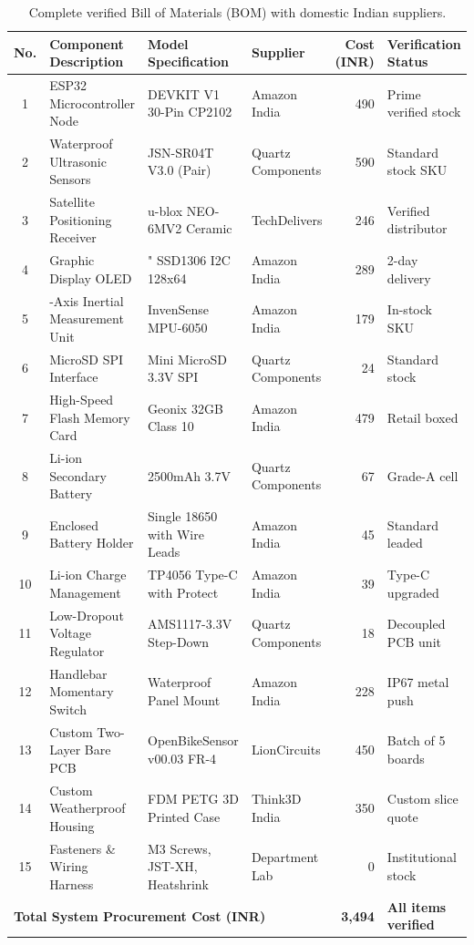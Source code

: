 \begin{table}[h!]
	\centering
	\caption{Complete verified Bill of Materials (BOM) with domestic Indian suppliers.}
	\label{tab:bom_verified}
	\setlength{\tabcolsep}{4pt}
	\renewcommand{\arraystretch}{1.2}
	\begin{tabularx}{\textwidth}{|c|>{\raggedright\arraybackslash}p{3.5cm}|>{\raggedright\arraybackslash}p{3.0cm}|>{\raggedright\arraybackslash}p{2.3cm}|r|X|}
		\hline
		\textbf{No.} & \textbf{Component Description} & \textbf{Model Specification} & \textbf{Supplier} & \textbf{Cost (INR)} & \textbf{Verification Status} \\
		\hline
		\hline
		1 & ESP32 Microcontroller Node & DEVKIT V1 30-Pin CP2102 & Amazon India & 490 & Prime verified stock \\
		2 & Waterproof Ultrasonic Sensors & JSN-SR04T V3.0 (Pair) & Quartz Components & 590 & Standard stock SKU \\
		3 & Satellite Positioning Receiver & u-blox NEO-6MV2 Ceramic & TechDelivers & 246 & Verified distributor \\
		4 & Graphic Display OLED & 0.96" SSD1306 I2C 128x64 & Amazon India & 289 & 2-day delivery \\
		5 & 6-Axis Inertial Measurement Unit & InvenSense MPU-6050 & Amazon India & 179 & In-stock SKU \\
		6 & MicroSD SPI Interface & Mini MicroSD 3.3V SPI & Quartz Components & 24 & Standard stock \\
		7 & High-Speed Flash Memory Card & Geonix 32GB Class 10 & Amazon India & 479 & Retail boxed \\
		8 & Li-ion Secondary Battery & 18650 2500mAh 3.7V & Quartz Components & 67 & Grade-A cell \\
		9 & Enclosed Battery Holder & Single 18650 with Wire Leads & Amazon India & 45 & Standard leaded \\
		10 & Li-ion Charge Management & TP4056 Type-C with Protect & Amazon India & 39 & Type-C upgraded \\
		11 & Low-Dropout Voltage Regulator & AMS1117-3.3V Step-Down & Quartz Components & 18 & Decoupled PCB unit \\
		12 & Handlebar Momentary Switch & 12mm Waterproof Panel Mount & Amazon India & 228 & IP67 metal push \\
		13 & Custom Two-Layer Bare PCB & OpenBikeSensor v00.03 FR-4 & LionCircuits & 450 & Batch of 5 boards \\
		14 & Custom Weatherproof Housing & FDM PETG 3D Printed Case & Think3D India & 350 & Custom slice quote \\
		15 & Fasteners \& Wiring Harness & M3 Screws, JST-XH, Heatshrink & Department Lab & 0 & Institutional stock \\
		\hline
		\multicolumn{4}{|l|}{\textbf{Total System Procurement Cost (INR)}} & \textbf{3,494} & \textbf{All items verified} \\
		\hline
	\end{tabularx}
\end{table}

